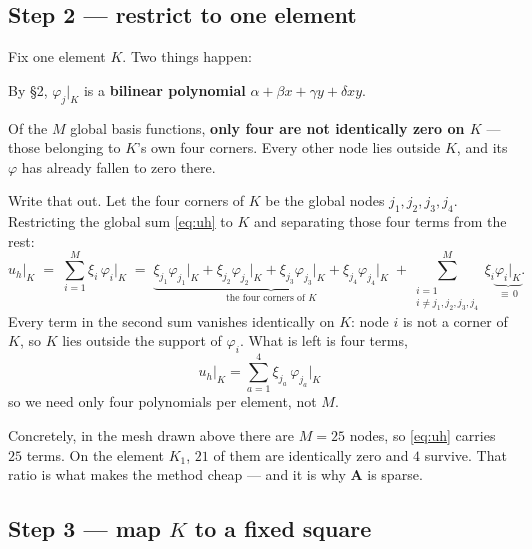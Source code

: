 \documentclass[11pt]{article}
\begin{document}
\subsection*{Step 2 --- restrict to one element}

Fix one element $K$. Two things happen:
\begin{steps}
\item By \S2, $\varphi_{j}\big|_{K}$ is a \textbf{bilinear polynomial}
      $\alpha+\beta x+\gamma y+\delta xy$.
\item Of the $M$ global basis functions, \textbf{only four are not identically
      zero on $K$} --- those belonging to $K$'s own four corners. Every other
      node lies outside $K$, and its $\varphi$ has already fallen to zero
      there.
\end{steps}
Write that out. Let the four corners of $K$ be the global nodes
$j_{1},j_{2},j_{3},j_{4}$. Restricting the global sum \eqref{eq:uh} to $K$ and
separating those four terms from the rest:
\begin{equation}\label{eq:restrict}
  u_{h}\big|_{K}
  \;=\;\sum_{i=1}^{M}\xi_{i}\,\varphi_{i}\big|_{K}
  \;=\;\underbrace{\xi_{j_{1}}\varphi_{j_{1}}\big|_{K}
       +\xi_{j_{2}}\varphi_{j_{2}}\big|_{K}
       +\xi_{j_{3}}\varphi_{j_{3}}\big|_{K}
       +\xi_{j_{4}}\varphi_{j_{4}}\big|_{K}}
       _{\text{the four corners of }K}
  \;+\!\!\!\sum_{\substack{i=1\\ i\neq j_{1},j_{2},j_{3},j_{4}}}^{M}\!\!\!
       \xi_{i}\underbrace{\varphi_{i}\big|_{K}}_{\equiv\,0} .
\end{equation}
Every term in the second sum vanishes identically on $K$: node $i$ is not a
corner of $K$, so $K$ lies outside the support of $\varphi_{i}$. What is left
is four terms,
\begin{equation}\label{eq:fourterms}
  \boxed{\;u_{h}\big|_{K}
   =\sum_{a=1}^{4}\xi_{j_{a}}\,\varphi_{j_{a}}\big|_{K}\;}
\end{equation}
so we need only four polynomials per element, not $M$.

\medskip
{\small\color{black!60}Concretely, in the mesh drawn above there are $M=25$
nodes, so \eqref{eq:uh} carries $25$ terms. On the element $K_{1}$, $21$ of
them are identically zero and $4$ survive. That ratio is what makes the method
cheap --- and it is why $\bm{A}$ is sparse.}

\subsection*{Step 3 --- map $K$ to a fixed square}
\end{document}
